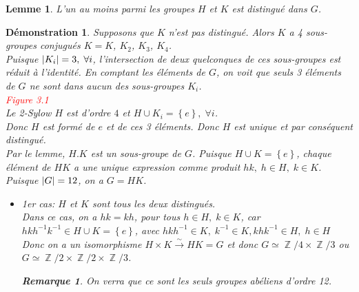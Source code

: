 \documentclass[a4paper, oneside]{report}
\theoremstyle{break}
\newtheorem{lemme}[thm]{Lemme}
\newtheorem{remarque}[thm]{Remarque}
\newtheorem*{demonstration}{Démonstration}
\newcommand{\red}[1]{\textcolor{red}{#1}}
\newcommand{\fong}{\overset{\sim}{\rightarrow}}
\DeclareMathOperator{\Z}{\mathbb{Z}}
\DeclarePairedDelimiter\ens{\left\{ }{\right\} }%
\DeclarePairedDelimiter\abs{\lvert}{\rvert}%
\renewcommand{\ens}[1]{\left\{ #1 \right\} }%
\begin{document}
\begin{lemme}
L'un au moins parmi les groupes $H$ et $K$ est distingué dans $G$.
\end{lemme}

\begin{demonstration}
Supposons que $K$ n'est pas distingué. Alors $K$ a 4 sous-groupes conjugués $K = K$, $K_2$, $K_3$, $K_4$.\\
Puisque $\abs{K_i} = 3, \; \forall i$, l'intersection de deux quelconques de ces sous-groupes est réduit à l'identité. En comptant les éléments de $G$, on voit que seuls 3 éléments de $G$ ne sont dans aucun des sous-groupes $K_i$.\\

\red{Figure 3.1}\\

Le 2-Sylow $H$ est d'ordre $4$ et $H \cup K_i = \ens{e}, \; \forall i$.\\
Donc $H$ est formé de $e$ et de ces 3 éléments. Donc $H$ est unique et par conséquent distingué.\\
Par le lemme, $H.K$ est un sous-groupe de $G$. Puisque $H \cup K = \ens{e}$, chaque élément de $HK$ a une unique expression comme produit $hk, \; h \in H, \; k \in K$. Puisque $\abs{G} = 12$, on a $G = HK$.
\begin{itemize}
\item 1er cas: $H$ et $K$ sont tous les deux distingués.\\
Dans ce cas, on a $hk = kh$, pour tous $h \in H, \; k \in K$, car	\quad	$hkh^{-1}k^{-1} \in  H \cup K = \ens{e}$, avec $hkh^{-1} \in K, \; k^{-1} \in K, khk^{-1} \in H, \; h \in H$\\
Donc on a un isomorphisme $H \times K \fong HK = G$ et donc $G \simeq \Z/4 \times \Z/3$ ou $G \simeq \Z/2 \times \Z/2 \times \Z/3$.

\begin{remarque}
On verra que ce sont les seuls groupes abéliens d'ordre 12.
\end{remarque}


\end{itemize}
\end{demonstration}
\end{document}
